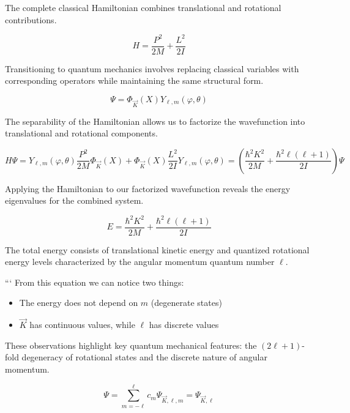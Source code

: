 \documentclass[10pt]{article}
\begin{document}
The complete classical Hamiltonian combines translational and rotational contributions.

\begin{equation*}
H=\frac{P^{2}}{2 M}+\frac{L^{2}}{2 I} \tag{8.75}
\end{equation*}

Transitioning to quantum mechanics involves replacing classical variables with corresponding operators while maintaining the same structural form.

\begin{equation*}
\Psi=\Phi_{\vec{K}}(X) Y_{\ell, m}(\varphi, \theta) \tag{8.76}
\end{equation*}

The separability of the Hamiltonian allows us to factorize the wavefunction into translational and rotational components.

\begin{equation*}
H \Psi=Y_{\ell, m}(\varphi, \theta) \frac{P^{2}}{2 M} \Phi_{\vec{K}}(X)+\Phi_{\vec{K}}(X) \frac{L^{2}}{2 I} Y_{\ell, m}(\varphi, \theta)=\left(\frac{\hbar^{2} K^{2}}{2 M}+\frac{\hbar^{2} \ell(\ell+1)}{2 I}\right) \Psi \tag{8.77}
\end{equation*}

Applying the Hamiltonian to our factorized wavefunction reveals the energy eigenvalues for the combined system.

\begin{equation*}
E=\frac{\hbar^{2} K^{2}}{2 M}+\frac{\hbar^{2} \ell(\ell+1)}{2 I} \tag{8.78}
\end{equation*}

The total energy consists of translational kinetic energy and quantized rotational energy levels characterized by the angular momentum quantum number $\ell$.

```
From this equation we can notice two things:

\begin{itemize}
  \item The energy does not depend on $m$ (degenerate states)
  \item $\vec{K}$ has continuous values, while $\ell$ has discrete values
\end{itemize}

These observations highlight key quantum mechanical features: the $(2\ell+1)$-fold degeneracy of rotational states and the discrete nature of angular momentum.

\begin{equation*}
\Psi=\sum_{m=-\ell}^{\ell} c_{m} \Psi_{\vec{K}, \ell, m}=\Psi_{\vec{K}, \ell} \tag{8.79}
\end{equation*}
\end{document}
